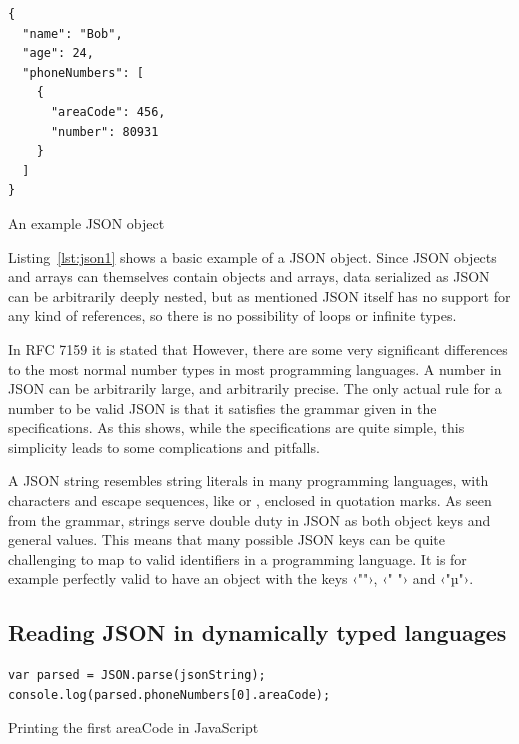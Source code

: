 \begin{listing}[ht!]
\begin{verbatim}
{
  "name": "Bob",
  "age": 24,
  "phoneNumbers": [
    {
      "areaCode": 456,
      "number": 80931
    }
  ]
}
\end{verbatim}
\caption{An example JSON object}
\label{lst:json1}
\end{listing}

Listing~\ref{lst:json1} shows a basic example of a JSON object. Since JSON objects and arrays can themselves contain objects and arrays, data serialized as JSON can be arbitrarily deeply nested, but as mentioned JSON itself has no support for any kind of references, so there is no possibility of loops or infinite types.

In RFC 7159 it is stated that  However, there are some very significant differences to the most normal number types in most programming languages. A number in JSON can be arbitrarily large, and arbitrarily precise. The only actual rule for a number to be valid JSON is that it satisfies the grammar given in the specifications. As this shows, while the specifications are quite simple, this simplicity leads to some complications and pitfalls.

A JSON string resembles string literals in many programming languages, with characters and escape sequences, like  or , enclosed in quotation marks. As seen from the grammar, strings serve double duty in JSON as both object keys and general values. This means that many possible JSON keys can be quite challenging to map to valid identifiers in a programming language. It is for example perfectly valid to have an object with the keys ‹""›, ‹" "› and ‹"µ"›.


\subsection{Reading JSON in dynamically typed languages}

\begin{listing}[ht!]
\begin{verbatim}
var parsed = JSON.parse(jsonString);
console.log(parsed.phoneNumbers[0].areaCode);
\end{verbatim}
\caption{Printing the first areaCode in JavaScript}
\label{lst:readjsonjs}
\end{listing}

